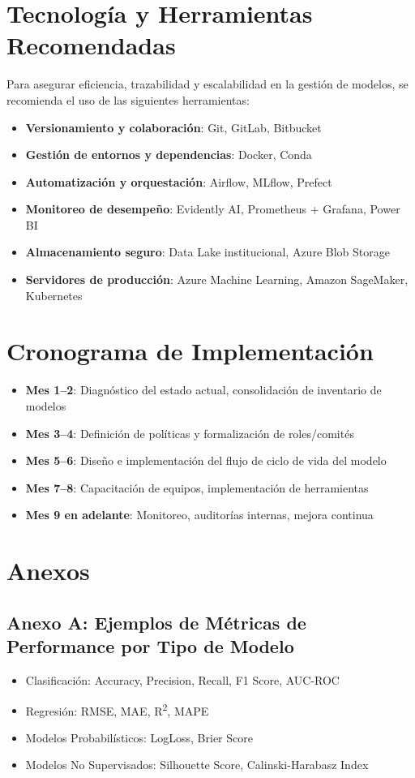 \documentclass[12pt]{article}
\begin{document}
\section{Tecnología y Herramientas Recomendadas}
Para asegurar eficiencia, trazabilidad y escalabilidad en la gestión de modelos, se recomienda el uso de las siguientes herramientas:
\begin{itemize}
  \item \textbf{Versionamiento y colaboración}: Git, GitLab, Bitbucket
  \item \textbf{Gestión de entornos y dependencias}: Docker, Conda
  \item \textbf{Automatización y orquestación}: Airflow, MLflow, Prefect
  \item \textbf{Monitoreo de desempeño}: Evidently AI, Prometheus + Grafana, Power BI
  \item \textbf{Almacenamiento seguro}: Data Lake institucional, Azure Blob Storage
  \item \textbf{Servidores de producción}: Azure Machine Learning, Amazon SageMaker, Kubernetes
\end{itemize}

\section{Cronograma de Implementación}
\begin{itemize}
  \item \textbf{Mes 1–2}: Diagnóstico del estado actual, consolidación de inventario de modelos
  \item \textbf{Mes 3–4}: Definición de políticas y formalización de roles/comités
  \item \textbf{Mes 5–6}: Diseño e implementación del flujo de ciclo de vida del modelo
  \item \textbf{Mes 7–8}: Capacitación de equipos, implementación de herramientas
  \item \textbf{Mes 9 en adelante}: Monitoreo, auditorías internas, mejora continua
\end{itemize}

\newpage
\appendix
\section*{Anexos}

\subsection*{Anexo A: Ejemplos de Métricas de Performance por Tipo de Modelo}
\begin{itemize}
  \item Clasificación: Accuracy, Precision, Recall, F1 Score, AUC-ROC
  \item Regresión: RMSE, MAE, R\textsuperscript{2}, MAPE
  \item Modelos Probabilísticos: LogLoss, Brier Score
  \item Modelos No Supervisados: Silhouette Score, Calinski-Harabasz Index
\end{itemize}
\end{document}
